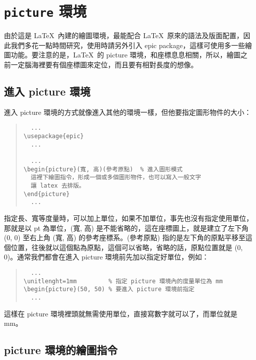 \section{\texttt{picture} 環境}
\label{sec:picture}

由於這是 \LaTeX\ 內建的繪圖環境，最能配合 \LaTeX\ 原來的語法及版面配置，因此我們多花一點時間研究，使用時請另外引入 {\sffamily epic} package，這樣可使用多一些繪圖功能。要注意的是，\LaTeX\ 的 {\ttfamily picture} 環境，和座標息息相關，所以，繪圖之前一定腦海裡要有個座標圖來定位，而且要有相對長度的想像。

\subsection{進入 {\ttfamily picture} 環境}

進入 {\ttfamily picture} 環境的方式就像進入其他的環境一樣，但他要指定圖形物件的大小：

\begin{quote}
  \begin{verbatim}
  ...
\usepackage{epic}
  ...

  ...
\begin{picture}(寬, 高)(參考原點)  % 進入圖形模式
  這裡下繪圖指令，形成一個或多個圖形物件，也可以寫入一般文字
  讓 latex 去排版。
\end{picture}
  ...

\end{verbatim}
\end{quote}

指定長、寬等度量時，可以加上單位，如果不加單位，事先也沒有指定使用單位，那就是以 pt 為單位，(寬, 高) 是不能省略的，這在座標圖上，就是建立了左下角 (0, 0) 至右上角 (寬, 高) 的參考座標系。(參考原點) 指的是左下角的原點平移至這個位置，往後就以這個點為原點，這個可以省略，省略的話，原點位置就是 (0, 0)。通常我們都會在進入 {\ttfamily picture} 環境前先加以指定好單位，例如：

\begin{quote}
  \begin{verbatim}
  ...
\unitlenght=1mm         % 指定 picture 環境內的度量單位為 mm
\begin{picture}(50, 50) % 要進入 picture 環境前指定
  ...
\end{verbatim}
\end{quote}

這樣在 {\ttfamily picture} 環境裡頭就無需使用單位，直接寫數字就可以了，而單位就是 mm。

\subsection{{\ttfamily picture} 環境的繪圖指令}


